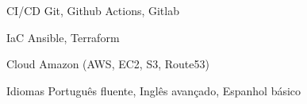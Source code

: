 \begin{cvskills}
\cvskill
    {CI/CD} %
    {Git, Github Actions, Gitlab} %


\cvskill
    {IaC} %
    {Ansible, Terraform} %

\cvskill
    {Cloud} %
    {Amazon (AWS, EC2, S3, Route53)} %


  \cvskill
    {Idiomas} %
    {Português fluente, Inglês avançado, Espanhol básico} %

\end{cvskills}